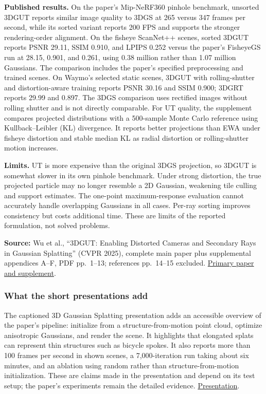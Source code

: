 \textbf{Published results.} On the paper's Mip-NeRF360 pinhole benchmark, unsorted 3DGUT reports similar image quality to 3DGS at 265 versus 347 frames per second, while its sorted variant reports 200 FPS and supports the stronger rendering-order alignment. On the fisheye ScanNet++ scenes, sorted 3DGUT reports PSNR 29.11, SSIM 0.910, and LPIPS 0.252 versus the paper's FisheyeGS run at 28.15, 0.901, and 0.261, using 0.38 million rather than 1.07 million Gaussians. The comparison includes the paper's specified preprocessing and trained scenes. On Waymo's selected static scenes, 3DGUT with rolling-shutter and distortion-aware training reports PSNR 30.16 and SSIM 0.900; 3DGRT reports 29.99 and 0.897. The 3DGS comparison uses rectified images without rolling shutter and is not directly comparable. For UT quality, the supplement compares projected distributions with a 500-sample Monte Carlo reference using Kullback--Leibler (KL) divergence. It reports better projections than EWA under fisheye distortion and stable median KL as radial distortion or rolling-shutter motion increases.

\textbf{Limits.} UT is more expensive than the original 3DGS projection, so 3DGUT is somewhat slower in its own pinhole benchmark. Under strong distortion, the true projected particle may no longer resemble a 2D Gaussian, weakening tile culling and support estimates. The one-point maximum-response evaluation cannot accurately handle overlapping Gaussians in all cases. Per-ray sorting improves consistency but costs additional time. These are limits of the reported formulation, not solved problems.

\textbf{Source:} Wu et al., ``3DGUT: Enabling Distorted Cameras and Secondary Rays in Gaussian Splatting'' (CVPR 2025), complete main paper plus supplemental appendices A--F, PDF pp.~1--13; references pp.~14--15 excluded. \href{https://research.nvidia.com/labs/toronto-ai/3DGUT/res/3DGUT_full_resolution.pdf}{Primary paper and supplement}.

\subsubsection{What the short presentations add}\label{04-visual-computing-ii-ch034-what-the-short-presentations-add}

The captioned 3D Gaussian Splatting presentation adds an accessible overview of the paper's pipeline: initialize from a structure-from-motion point cloud, optimize anisotropic Gaussians, and render the scene. It highlights that elongated splats can represent thin structures such as bicycle spokes. It also reports more than 100 frames per second in shown scenes, a 7,000-iteration run taking about six minutes, and an ablation using random rather than structure-from-motion initialization. These are claims made in the presentation and depend on its test setup; the paper's experiments remain the detailed evidence. \href{https://www.youtube.com/watch?v=T_kXY43VZnk}{Presentation}.

